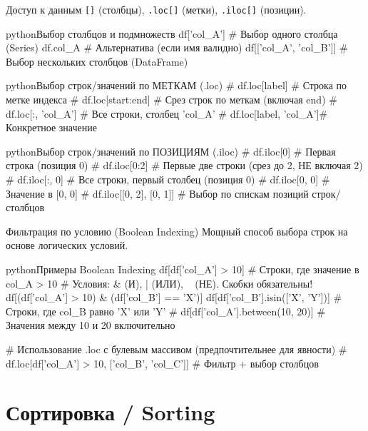 \begin{textbox}{Доступ к данным}
 \texttt{[]} (столбцы), \texttt{.loc[]} (метки), \texttt{.iloc[]} (позиции).

\begin{codebox}{python}{Выбор столбцов и подмножеств}
df['col_A']     # Выбор одного столбца (Series)
df.col_A        # Альтернатива (если имя валидно)
df[['col_A', 'col_B']] # Выбор нескольких столбцов (DataFrame)
\end{codebox}

\begin{codebox}{python}{Выбор строк/значений по МЕТКАМ (.loc)}
# df.loc[label]         # Строка по метке индекса
# df.loc[start:end]     # Срез строк по меткам (включая end)
# df.loc[:, 'col_A']    # Все строки, столбец 'col_A'
# df.loc[label, 'col_A']# Конкретное значение
\end{codebox}

\begin{codebox}{python}{Выбор строк/значений по ПОЗИЦИЯМ (.iloc)}
# df.iloc[0]          # Первая строка (позиция 0)
# df.iloc[0:2]        # Первые две строки (срез до 2, НЕ включая 2)
# df.iloc[:, 0]       # Все строки, первый столбец (позиция 0)
# df.iloc[0, 0]       # Значение в [0, 0]
# df.iloc[[0, 2], [0, 1]] # Выбор по спискам позиций строк/столбцов
\end{codebox}
\end{textbox}

\begin{myexampleblock}{Фильтрация по условию (Boolean Indexing)}
Мощный способ выбора строк на основе логических условий.
\begin{codebox}{python}{Примеры Boolean Indexing}
df[df['col_A'] > 10] # Строки, где значение в col_A > 10
# Условия: & (И), | (ИЛИ), ~ (НЕ). Скобки обязательны!
df[(df['col_A'] > 10) & (df['col_B'] == 'X')]
df[df['col_B'].isin(['X', 'Y'])] # Строки, где col_B равно 'X' или 'Y'
# df[df['col_A'].between(10, 20)] # Значения между 10 и 20 включительно

# Использование .loc с булевым массивом (предпочтительнее для явности)
# df.loc[df['col_A'] > 10, ['col_B', 'col_C']] # Фильтр + выбор столбцов
\end{codebox}
\end{myexampleblock}

\section{Сортировка / Sorting}


